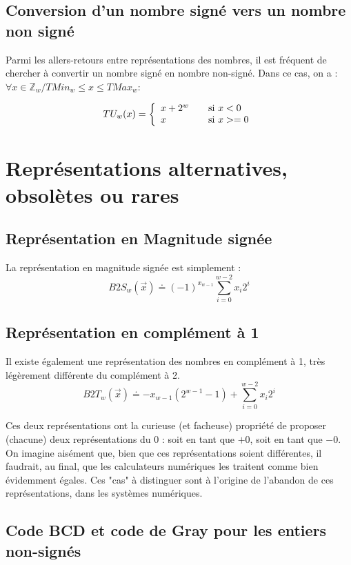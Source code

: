 \subsection{Conversion d'un nombre signé vers un nombre non signé}
Parmi les allers-retours entre représentations des nombres, il est fréquent de chercher à convertir un nombre signé en nombre non-signé. Dans ce cas, on a :
$\forall x \in \mathbb{Z}_w / TMin_w \leq x \leq TMax_w:$

\[TU_w(x) = \left\{
\begin{array}{l l}
  x+2^w & \quad \text{si $x < 0$} \\
  x     & \quad \text{si $x >= 0$}\\ \end{array} \right. \]


\section{Représentations alternatives, obsolètes ou rares}

\subsection{Représentation en Magnitude signée}
La représentation en magnitude signée est simplement :
$$B2S_w(\vec{x}) \doteq (-1)^{x_{w-1}} \sum_{i=0}^{w-2}x_i2^i$$

\subsection{Représentation en complément à 1}
Il existe également une représentation des nombres en complément à 1, très légèrement différente du complément à 2.
$$B2T_w(\vec{x}) \doteq -x_{w-1}(2^{w-1}-1) + \sum_{i=0}^{w-2}x_i2^i$$

Ces deux représentations ont la curieuse (et facheuse) propriété de proposer (chacune) deux représentations du 0 : soit en tant que $+0$, soit en tant que
$-0$. On imagine aisément que, bien que ces représentations soient différentes, il faudrait, au final, que les calculateurs numériques les traitent comme bien évidemment égales.
Ces "cas" à distinguer sont à l'origine de l'abandon de ces représentations, dans les systèmes numériques.

\subsection{Code BCD et code de Gray pour les entiers non-signés}

